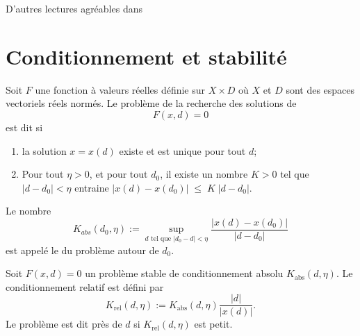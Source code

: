 
D'autres lectures agréables dans \cite{GianlucaB}

\section{Conditionnement et stabilité}

\begin{definition}
	Soit $F$ une fonction à valeurs réelles définie sur $X\times D$ où $X$ et $D$ sont des espaces vectoriels réels normés. Le problème de la recherche des solutions de
	\begin{equation}
		F(x,d)=0
	\end{equation}
	est dit  si
	\begin{enumerate}
		\item
			la solution $x=x(d)$ existe et est unique pour tout $d$;
		\item \label{ItemProbStableB}
			Pour tout $\eta>0$, et pour tout $d_0$, il existe un nombre $K>0$ tel que $|d-d_0|<\eta$ entraine $|x(d)-x(d_0)|\;\leq\;K\;|d-d_0|$.
	\end{enumerate}
\end{definition}
Le nombre
\begin{equation}        \label{EqDefAABSOLU}
	K_{abs}(d_0,\eta):=\sup_{d\text{ tel que $|d_0-d|<\eta$}}\frac{|x(d)-x(d_0)|}{|d-d_0|}
\end{equation}
est appelé le  du problème autour de $d_0$.

\begin{definition}
	Soit $F(x,d)=0$ un problème stable de conditionnement absolu $K_{\text{abs}}(d,\eta)$.  Le conditionnement relatif est défini par
	\begin{equation}
		K_{\text{rel}}(d,\eta):=K_{\text{abs}}(d,\eta)\frac{|d|}{|x(d)|}.
	\end{equation}
	Le problème est dit  près de $d$ si $K_{\text{rel}}(d,\eta)$ est petit.
\end{definition}


